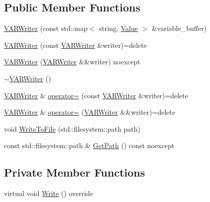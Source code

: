 \subsection*{Public Member Functions}
\begin{DoxyCompactItemize}
\item 
\mbox{\hyperlink{classmage_1_1loader_1_1_v_a_r_writer_af9b9e552dc77446790bbd52390b42582}{V\+A\+R\+Writer}} (const std\+::map$<$ string, \mbox{\hyperlink{namespacemage_a5bc219b33037a43e23f59e4e8ddff10d}{Value}} $>$ \&variable\+\_\+buffer)
\item 
\mbox{\hyperlink{classmage_1_1loader_1_1_v_a_r_writer_a5ddb3fcd75952ecc8593bc284dc3db0e}{V\+A\+R\+Writer}} (const \mbox{\hyperlink{classmage_1_1loader_1_1_v_a_r_writer}{V\+A\+R\+Writer}} \&writer)=delete
\item 
\mbox{\hyperlink{classmage_1_1loader_1_1_v_a_r_writer_ab8a676252c909a6f8914d786048de255}{V\+A\+R\+Writer}} (\mbox{\hyperlink{classmage_1_1loader_1_1_v_a_r_writer}{V\+A\+R\+Writer}} \&\&writer) noexcept
\item 
\mbox{\hyperlink{classmage_1_1loader_1_1_v_a_r_writer_af908fe01c6754dabec6ed3c45b852b3b}{$\sim$\+V\+A\+R\+Writer}} ()
\item 
\mbox{\hyperlink{classmage_1_1loader_1_1_v_a_r_writer}{V\+A\+R\+Writer}} \& \mbox{\hyperlink{classmage_1_1loader_1_1_v_a_r_writer_a6ffe21455dfc82f8d829d9cabe59ba53}{operator=}} (const \mbox{\hyperlink{classmage_1_1loader_1_1_v_a_r_writer}{V\+A\+R\+Writer}} \&writer)=delete
\item 
\mbox{\hyperlink{classmage_1_1loader_1_1_v_a_r_writer}{V\+A\+R\+Writer}} \& \mbox{\hyperlink{classmage_1_1loader_1_1_v_a_r_writer_aef0efc3b6d9ca8c0da5e45063da01365}{operator=}} (\mbox{\hyperlink{classmage_1_1loader_1_1_v_a_r_writer}{V\+A\+R\+Writer}} \&\&writer)=delete
\item 
void \mbox{\hyperlink{classmage_1_1loader_1_1_v_a_r_writer_ac01e930b55888da88e345b0910d4b1c2}{Write\+To\+File}} (std\+::filesystem\+::path path)
\item 
const std\+::filesystem\+::path \& \mbox{\hyperlink{classmage_1_1loader_1_1_v_a_r_writer_ab023ae8174132f233c6e1fa4d3a2a1c8}{Get\+Path}} () const noexcept
\end{DoxyCompactItemize}
\subsection*{Private Member Functions}
\begin{DoxyCompactItemize}
\item 
virtual void \mbox{\hyperlink{classmage_1_1loader_1_1_v_a_r_writer_af2bbf94353f1b4b01aa56e8dd9c89d7f}{Write}} () override
\end{DoxyCompactItemize}
